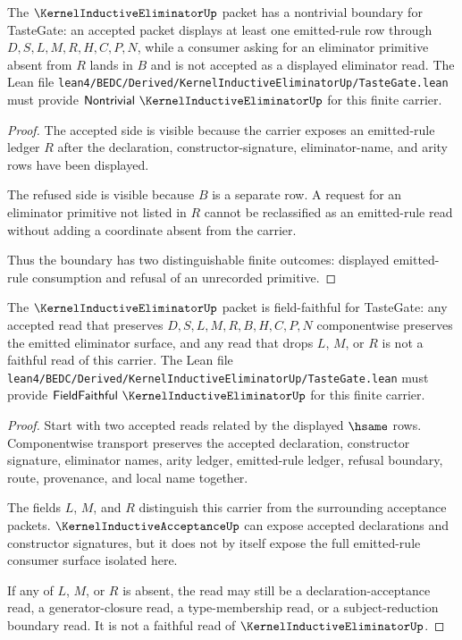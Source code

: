 \begin{theorem}
\label{thm:kernel-inductive-eliminator-nontrivial-boundary}
The $\KernelInductiveEliminatorUp$ packet has a nontrivial boundary for TasteGate: an accepted packet displays at least one emitted-rule row through $D,S,L,M,R,H,C,P,N$, while a consumer asking for an eliminator primitive absent from $R$ lands in $B$ and is not accepted as a displayed eliminator read. The Lean file \texttt{lean4/BEDC/Derived/KernelInductiveEliminatorUp/TasteGate.lean} must provide $\mathsf{Nontrivial}\ \KernelInductiveEliminatorUp$ for this finite carrier.
\end{theorem}
\begin{proof}
The accepted side is visible because the carrier exposes an emitted-rule ledger $R$ after the declaration, constructor-signature, eliminator-name, and arity rows have been displayed.

The refused side is visible because $B$ is a separate row. A request for an eliminator primitive not listed in $R$ cannot be reclassified as an emitted-rule read without adding a coordinate absent from the carrier.

Thus the boundary has two distinguishable finite outcomes: displayed emitted-rule consumption and refusal of an unrecorded primitive.
\end{proof}

\begin{theorem}
\label{thm:kernel-inductive-eliminator-field-faithful-boundary}
The $\KernelInductiveEliminatorUp$ packet is field-faithful for TasteGate: any accepted read that preserves $D,S,L,M,R,B,H,C,P,N$ componentwise preserves the emitted eliminator surface, and any read that drops $L$, $M$, or $R$ is not a faithful read of this carrier. The Lean file \texttt{lean4/BEDC/Derived/KernelInductiveEliminatorUp/TasteGate.lean} must provide $\mathsf{FieldFaithful}\ \KernelInductiveEliminatorUp$ for this finite carrier.
\end{theorem}
\begin{proof}
Start with two accepted reads related by the displayed $\hsame$ rows. Componentwise transport preserves the accepted declaration, constructor signature, eliminator names, arity ledger, emitted-rule ledger, refusal boundary, route, provenance, and local name together.

The fields $L$, $M$, and $R$ distinguish this carrier from the surrounding acceptance packets. $\KernelInductiveAcceptanceUp$ can expose accepted declarations and constructor signatures, but it does not by itself expose the full emitted-rule consumer surface isolated here.

If any of $L$, $M$, or $R$ is absent, the read may still be a declaration-acceptance read, a generator-closure read, a type-membership read, or a subject-reduction boundary read. It is not a faithful read of $\KernelInductiveEliminatorUp$.
\end{proof}

